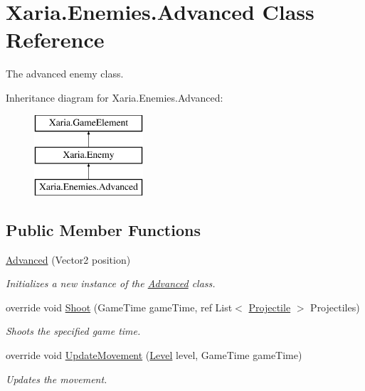 \hypertarget{classXaria_1_1Enemies_1_1Advanced}{}\section{Xaria.\+Enemies.\+Advanced Class Reference}
\label{classXaria_1_1Enemies_1_1Advanced}


The advanced enemy class.  


Inheritance diagram for Xaria.\+Enemies.\+Advanced\+:\begin{figure}[H]
\begin{center}
\leavevmode
\includegraphics[height=3.000000cm]{classXaria_1_1Enemies_1_1Advanced}
\end{center}
\end{figure}
\subsection*{Public Member Functions}
\begin{DoxyCompactItemize}
\item 
\hyperlink{classXaria_1_1Enemies_1_1Advanced_a95ef3638503f6222b361af83bf94e7c5}{Advanced} (Vector2 position)
\begin{DoxyCompactList}\small\item\em Initializes a new instance of the \hyperlink{classXaria_1_1Enemies_1_1Advanced}{Advanced} class. \end{DoxyCompactList}\item 
override void \hyperlink{classXaria_1_1Enemies_1_1Advanced_af838890dc217792b449a18a266e5518b}{Shoot} (Game\+Time game\+Time, ref List$<$ \hyperlink{classXaria_1_1Projectile}{Projectile} $>$ Projectiles)
\begin{DoxyCompactList}\small\item\em Shoots the specified game time. \end{DoxyCompactList}\item 
override void \hyperlink{classXaria_1_1Enemies_1_1Advanced_a1b3201d7cb5a9aeb8c6bf3fa99b0e194}{Update\+Movement} (\hyperlink{classXaria_1_1Level}{Level} level, Game\+Time game\+Time)
\begin{DoxyCompactList}\small\item\em Updates the movement. \end{DoxyCompactList}\end{DoxyCompactItemize}
